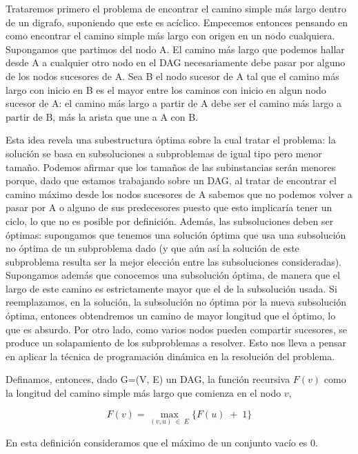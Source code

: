 Trataremos primero el problema de encontrar el camino simple m\'as largo dentro de un digrafo, suponiendo que este es ac\'iclico. 
Empecemos entonces pensando en como encontrar el camino simple m\'as largo con origen en un nodo cualquiera.
Supongamos que partimos del nodo A. 
El camino m\'as largo que podemos hallar desde A a cualquier otro nodo en el DAG necesariamente
debe pasar por alguno de los nodos sucesores de A. Sea B el nodo sucesor de A tal que el camino m\'as largo con inicio en B es el mayor entre los caminos con inicio en algun nodo sucesor de A:
el camino m\'as largo a partir de A debe ser el camino m\'as largo a partir de B, m\'as la arista que une a A con B.

Esta idea revela una subestructura \'optima sobre la cual tratar el problema: la soluci\'on se basa en subsoluciones a subproblemas de igual tipo pero menor tamaño. 
Podemos afirmar que los tamaños de las subinstancias ser\'an menores porque, dado que estamos trabajando sobre un DAG, al tratar de encontrar el camino m\'aximo desde los nodos sucesores de A sabemos que no podemos volver a pasar por A o alguno de sus predecesores puesto que esto implicar\'ia tener un ciclo, lo que no es posible por definici\'on. 
Adem\'as, las subsoluciones deben ser \'optimas: supongamos que tenemos una soluci\'on \'optima que usa una subsoluci\'on no \'optima de un subproblema dado (y que a\'un as\'i la soluci\'on de este subproblema resulta ser la mejor elecci\'on entre las subsoluciones consideradas). Supongamos adem\'as que conocemos una subsoluci\'on \'optima, de manera que el largo de este camino es estrictamente mayor que el de la subsoluci\'on usada. Si reemplazamos, en la soluci\'on, la subsoluci\'on no \'optima por la nueva subsoluci\'on \'optima, entonces obtendremos un camino de mayor longitud que el \'optimo, lo que es absurdo.
Por otro lado, como varios nodos pueden compartir sucesores, se produce un solapamiento de los subproblemas a resolver.  
Esto nos lleva a pensar en aplicar la t\'ecnica de programaci\'on din\'amica en la resoluci\'on del problema.

Definamos, entonces, dado G=(V, E) un DAG, la funci\'on recursiva $F(v)$ como la longitud del camino simple más largo que comienza en el nodo $v$, 

$$F(v)= \max_{(v, u)\;\in\;E} \{F(u)\; + \; 1\}$$

En esta definici\'on consideramos que el m\'aximo de un conjunto vac\'io es 0.

